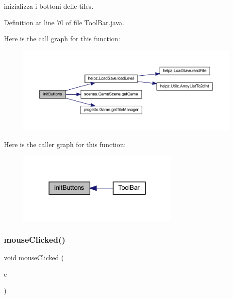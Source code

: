 inizializza i bottoni delle tiles. 



Definition at line 70 of file Tool\+Bar.\+java.

Here is the call graph for this function\+:\nopagebreak
\begin{figure}[H]
\begin{center}
\leavevmode
\includegraphics[width=350pt]{classui_1_1_tool_bar_a27d3ba5afb772cc36c9a432c28975ace_cgraph}
\end{center}
\end{figure}
Here is the caller graph for this function\+:\nopagebreak
\begin{figure}[H]
\begin{center}
\leavevmode
\includegraphics[width=229pt]{classui_1_1_tool_bar_a27d3ba5afb772cc36c9a432c28975ace_icgraph}
\end{center}
\end{figure}
\mbox{\label{classui_1_1_tool_bar_a45d56bd84238e8b56589dfc732e2b2cf}} 
\subsubsection{\texorpdfstring{mouse\+Clicked()}{mouseClicked()}}
{\footnotesize\ttfamily void mouse\+Clicked (\begin{DoxyParamCaption}\item[{Mouse\+Event}]{e }\end{DoxyParamCaption})}



